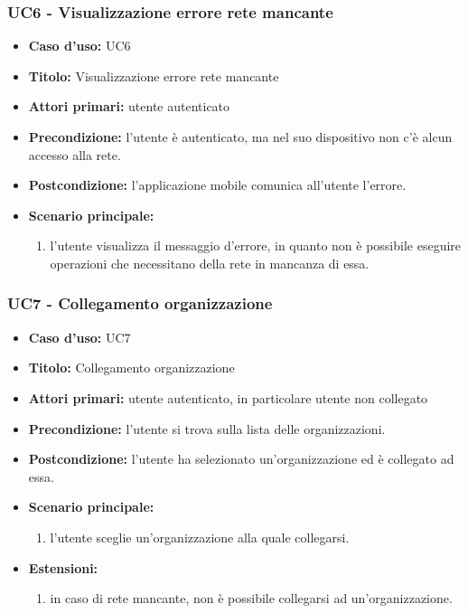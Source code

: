 \documentclass[casi-duso]{subfiles}
\begin{document}
\subsubsection{UC6 - Visualizzazione errore rete mancante}
\label{subsub:uc6utente}
\begin{itemize}
  \item \textbf{Caso d’uso:} UC6
  \item \textbf{Titolo:} Visualizzazione errore rete mancante
  \item \textbf{Attori primari:} utente autenticato
  \item \textbf{Precondizione:} l'utente è autenticato, ma nel suo dispositivo non c'è alcun accesso alla rete.
  \item \textbf{Postcondizione:} l'applicazione mobile comunica all'utente l'errore.
  \item \textbf{Scenario principale:} 
  \begin{enumerate}
    \item l'utente visualizza il messaggio d'errore, in quanto non è possibile eseguire operazioni che necessitano della rete in mancanza di essa.
  \end{enumerate}  
\end{itemize}

\subsubsection{UC7 - Collegamento organizzazione}
\label{subsub:uc7utente}
\begin{itemize}
  \item \textbf{Caso d’uso:} UC7
  \item \textbf{Titolo:} Collegamento organizzazione
  \item \textbf{Attori primari:} utente autenticato, in particolare utente non collegato
  \item \textbf{Precondizione:} l'utente si trova sulla lista delle organizzazioni.
  \item \textbf{Postcondizione:} l'utente ha selezionato un'organizzazione ed è collegato ad essa.
  \item \textbf{Scenario principale:} 
  \begin{enumerate}
    \item l'utente sceglie un'organizzazione alla quale collegarsi.
  \end{enumerate}  
  \item \textbf{Estensioni:} 
  \begin{enumerate}
    \item in caso di rete mancante, non è possibile collegarsi ad un'organizzazione.
  \end{enumerate}  
\end{itemize}
\end{document}
